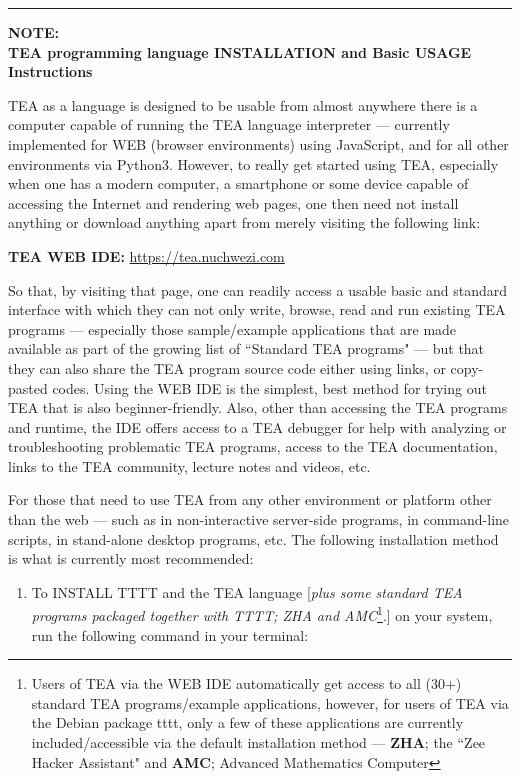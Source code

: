 \documentclass[a4paper, 18pt]{book} %
\begin{document}
\noindent\rule{\textwidth}{0.4pt}
{


\noindent\textbf{NOTE:}\\
\noindent\textbf{TEA programming language INSTALLATION and Basic USAGE Instructions}

\normalsize
\vspace{2em}

TEA as a language is designed to be usable from almost anywhere there is a computer capable of running the TEA language interpreter --- currently implemented for WEB (browser environments) using JavaScript, and for all other environments via Python3. However, to really get started using TEA, especially when one has a modern computer, a smartphone or some device capable of accessing the Internet and rendering web pages, one then need not install anything or download anything apart from merely visiting the following link:

\vspace{1em}
\textbf{TEA WEB IDE:} \url{https://tea.nuchwezi.com}
\vspace{1em}

So that, by visiting that page, one can readily access a usable basic and standard interface with which they can not only write, browse, read and run existing TEA programs --- especially those sample/example applications that are made available as part of the growing list of ``Standard TEA programs" --- but that they can also share the TEA program source code either using links, or copy-pasted codes. Using the WEB IDE is the simplest, best method for trying out TEA that is also beginner-friendly. Also, other than accessing the TEA programs and runtime, the IDE offers access to a TEA debugger for help with analyzing or troubleshooting problematic TEA programs, access to the TEA documentation, links to the TEA community, lecture notes and videos, etc.

For those that need to use TEA from any other environment or platform other than the web --- such as in non-interactive server-side programs, in command-line scripts, in stand-alone desktop programs, etc. The following installation method is what is currently most recommended:

\begin{enumerate}
\item To INSTALL TTTT and the TEA language [\textit{plus some standard TEA programs packaged together with TTTT; ZHA and AMC}\footnote{Users of TEA via the WEB IDE automatically get access to all (30+) standard TEA programs/example applications, however, for users of TEA via the Debian package tttt, only a few of these applications are currently included/accessible via the default installation method --- \textbf{ZHA}; the ``Zee Hacker Assistant" and \textbf{AMC}; Advanced Mathematics Computer}.] on your system, run the following command in your terminal:


\end{enumerate}}
\end{document}
